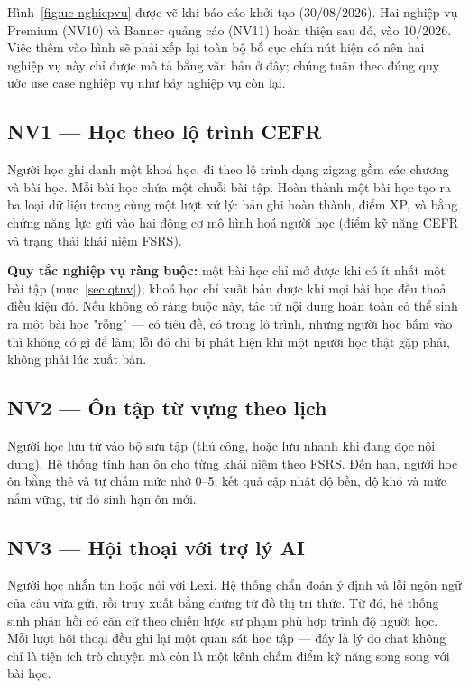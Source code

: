 \begin{luuy}
Hình~\ref{fig:uc-nghiepvu} được vẽ khi báo cáo khởi tạo (30/08/2026). Hai nghiệp vụ
Premium (NV10) và Banner quảng cáo (NV11) hoàn thiện sau đó, vào 10/2026. Việc thêm vào
hình sẽ phải xếp lại toàn bộ bố cục chín nút hiện có nên hai nghiệp vụ này chỉ được mô tả
bằng văn bản ở đây; chúng tuân theo đúng quy ước use case nghiệp vụ như bảy nghiệp vụ còn lại.
\end{luuy}

\subsection{NV1 — Học theo lộ trình CEFR}

Người học ghi danh một khoá học, đi theo lộ trình dạng zigzag gồm các chương và bài học.
Mỗi bài học chứa một chuỗi bài tập. Hoàn thành một bài học tạo ra ba loại dữ liệu trong
cùng một lượt xử lý: bản ghi hoàn thành, điểm XP, và bằng chứng năng lực gửi vào hai động
cơ mô hình hoá người học (điểm kỹ năng CEFR và trạng thái khái niệm FSRS).

\textbf{Quy tắc nghiệp vụ ràng buộc:} một bài học chỉ mở được khi có ít nhất một bài tập
(mục~\ref{sec:qtnv}); khoá học chỉ xuất bản được khi mọi bài học đều thoả điều kiện đó. Nếu
không có ràng buộc này, tác tử nội dung hoàn toàn có thể sinh ra một bài học "rỗng" —
có tiêu đề, có trong lộ trình, nhưng người học bấm vào thì không có gì để làm; lỗi đó chỉ
bị phát hiện khi một người học thật gặp phải, không phải lúc xuất bản.

\subsection{NV2 — Ôn tập từ vựng theo lịch}

Người học lưu từ vào bộ sưu tập (thủ công, hoặc lưu nhanh khi đang đọc nội dung). Hệ thống
tính hạn ôn cho từng khái niệm theo FSRS. Đến hạn, người học ôn bằng thẻ và tự chấm mức
nhớ 0--5; kết quả cập nhật độ bền, độ khó và mức nắm vững, từ đó sinh hạn ôn mới.

\subsection{NV3 — Hội thoại với trợ lý AI}

Người học nhắn tin hoặc nói với Lexi. Hệ thống chẩn đoán ý định và lỗi ngôn ngữ của câu vừa
gửi, rồi truy xuất bằng chứng từ đồ thị tri thức. Từ đó, hệ thống sinh phản hồi có căn cứ
theo chiến lược sư phạm phù hợp trình độ người học. Mỗi lượt hội thoại đều ghi lại một quan
sát học tập — đây là lý do chat không chỉ là tiện ích trò chuyện mà còn là một kênh chấm
điểm kỹ năng song song với bài học.

